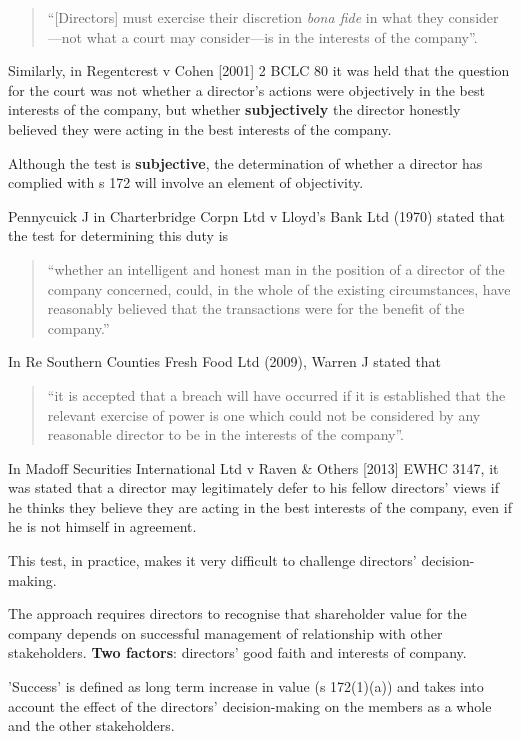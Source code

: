 \documentclass[
]{article}
\begin{document}
\begin{quote}
``{[}Directors{]} must exercise their discretion \emph{bona fide} in
what they consider---not what a court may consider---is in the interests
of the company''.
\end{quote}

Similarly, in Regentcrest v Cohen {[}2001{]} 2 BCLC 80 it was held that
the question for the court was not whether a director's actions were
objectively in the best interests of the company, but whether
\textbf{subjectively} the director honestly believed they were acting in
the best interests of the company.

Although the test is \textbf{subjective}, the determination of whether a
director has complied with s 172 will involve an element of objectivity.

Pennycuick J in Charterbridge Corpn Ltd v Lloyd's Bank Ltd (1970) stated
that the test for determining this duty is

\begin{quote}
``whether an intelligent and honest man in the position of a director of
the company concerned, could, in the whole of the existing
circumstances, have reasonably believed that the transactions were for
the benefit of the company.''
\end{quote}

In Re Southern Counties Fresh Food Ltd (2009), Warren J stated that

\begin{quote}
``it is accepted that a breach will have occurred if it is established
that the relevant exercise of power is one which could not be considered
by any reasonable director to be in the interests of the company''.
\end{quote}

In Madoff Securities International Ltd v Raven \& Others {[}2013{]} EWHC
3147, it was stated that a director may legitimately defer to his fellow
directors' views if he thinks they believe they are acting in the best
interests of the company, even if he is not himself in agreement.

This test, in practice, makes it very difficult to challenge directors'
decision-making.

The approach requires directors to recognise that shareholder value for
the company depends on successful management of relationship with other
stakeholders. \textbf{Two factors}: directors' good faith and interests
of company.

'Success' is defined as long term increase in value (s 172(1)(a)) and
takes into account the effect of the directors' decision-making on the
members as a whole and the other stakeholders.
\end{document}
